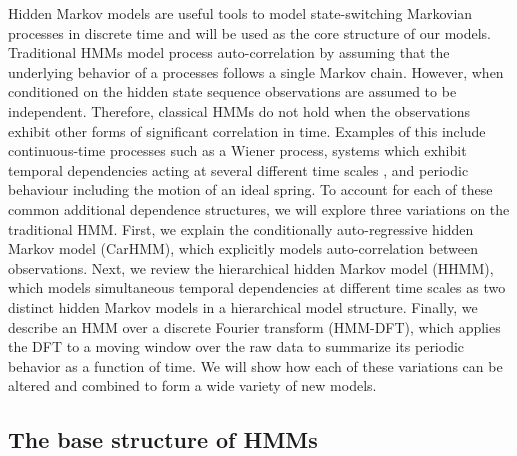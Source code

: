 
Hidden Markov models are useful tools to model state-switching Markovian processes in discrete time and will be used as the core structure of our models. Traditional HMMs model process auto-correlation by assuming that the underlying behavior of a processes follows a single Markov chain. However, when conditioned on the hidden state sequence observations are assumed to be independent. Therefore, classical HMMs do not hold when the observations exhibit other forms of significant correlation in time. Examples of this include continuous-time processes such as a Wiener process, systems which exhibit temporal dependencies acting at several different time scales \citep{Barajas:2017}, and periodic behaviour including the motion of an ideal spring.  
To account for each of these common additional dependence structures, we will explore three variations on the traditional HMM. First, we explain the conditionally auto-regressive hidden Markov model (CarHMM), which explicitly models auto-correlation between observations. Next, we review the hierarchical hidden Markov model (HHMM), which models simultaneous temporal dependencies at different time scales as two distinct hidden Markov models in a hierarchical model structure. Finally, we describe an HMM over a discrete Fourier transform (HMM-DFT), which applies the DFT to a moving window over the raw data to summarize its periodic behavior as a function of time. We will show how each of these variations can be altered and combined to form a wide variety of new models.

\subsection{The base structure of HMMs}

